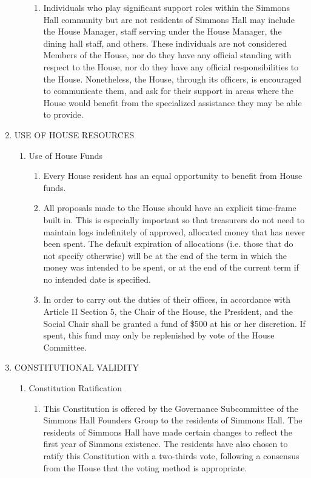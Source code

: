 \documentclass[letterpaper]{article}
\begin{document}
\begin{enumerate}
\begin{enumerate}
\begin{enumerate}
\item Individuals who play significant support roles within the Simmons
Hall community but are not residents of Simmons Hall may include the
House Manager, staff serving under the House Manager, the dining hall
staff, and others. These individuals are not considered Members of the
House, nor do they have any official standing with respect to the
House, nor do they have any official responsibilities to the House.
Nonetheless, the House, through its officers, is encouraged to
communicate them, and ask for their support in areas where the House
would benefit from the specialized assistance they may be able to
provide.
\end{enumerate}
\end{enumerate}
\item USE OF HOUSE RESOURCES 

\begin{enumerate}
\item Use of House Funds 

\begin{enumerate}
\item Every House resident has an equal opportunity to benefit from
House funds.
\item All proposals made to the House should have an explicit time-frame
built in. This is especially important so that treasurers do not need
to maintain logs indefinitely of approved, allocated money that has
never been spent. The {\textquotedbl}default{\textquotedbl} expiration
of allocations (i.e. those that do not specify otherwise) will be at
the end of the term in which the money was intended to be spent, or at
the end of the current term if no intended date is specified.
\item In order to carry out the duties of their offices, in accordance
with Article II Section 5, the Chair of the House, the President, and
the Social Chair shall be granted a fund of \$500 at his or her
discretion. If spent, this fund may only be replenished by vote of the
House Committee.
\end{enumerate}
\end{enumerate}
\item CONSTITUTIONAL VALIDITY 

\begin{enumerate}
\item Constitution Ratification 

\begin{enumerate}
\item This Constitution is offered by the Governance Subcommittee of the
Simmons Hall Founders Group to the residents of Simmons Hall. The
residents of Simmons Hall have made certain changes to reflect the
first year of Simmons{\textquotesingle} existence. The residents have
also chosen to ratify this Constitution with a two-thirds vote,
following a consensus from the House that the voting method is
appropriate. 
\end{enumerate}
\end{enumerate}
\end{enumerate}
\end{document}
